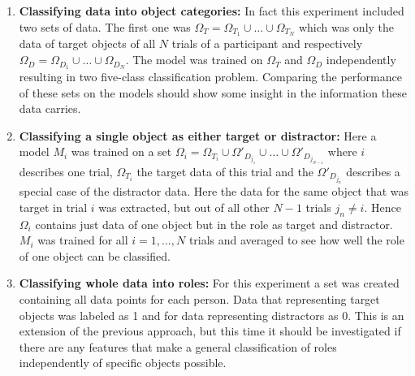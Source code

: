 \begin{enumerate}
	\item \textbf{Classifying data into object categories:} In fact this experiment included two sets of data. The first one was $ \Omega_{T} = \Omega_{T_{1}} \cup \hdots \cup \Omega_{T_{N}}$ which was only the data of target objects of all $ N $ trials of a participant and respectively $ \Omega_{D} = \Omega_{D_{1}} \cup \hdots \cup \Omega_{D_{N}}$. The model was trained on $ \Omega_{T} $ and $ \Omega_{D} $ independently resulting in two five-class classification problem. Comparing the performance of these sets on the models should show some insight in the information these data carries.
	
	\item \textbf{Classifying a single object as either target or distractor:} Here a model $ M_{i} $ was trained on a set $\Omega_{i} = \Omega_{T_{i}} \cup \Omega'_{D_{j_{1}}} \cup \hdots \cup \Omega'_{D_{j_{N-1}}} $ where $ i $ describes one trial, $ \Omega_{T_{i}} $ the target data of this trial and the $ \Omega'_{D_{j_{n}}} $ describes a special case of the distractor data. Here the data for the same object that was target in trial $ i $ was extracted, but out of all other $ N-1 $ trials $ j_{n} \neq i $. Hence $ \Omega_{i} $ contains just data of one object but in the role as target and distractor. $ M_{i} $ was trained for all $i = 1,...,N $ trials and averaged to see how well the role of one object can be classified.
	
	\item \textbf{Classifying whole data into roles:} For this experiment a set was created containing all data points for each person. Data that representing target objects was labeled as 1 and for data representing distractors as 0. This is an extension of the previous approach, but this time it should be investigated if there are any features that make a general classification of roles independently of specific objects possible.    
\end{enumerate}  

